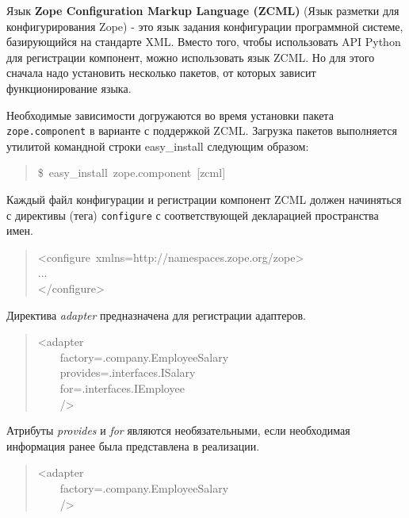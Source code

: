 \documentclass[14pt,a4paper,openany,twoside,final]{extbook}
\providecommand*{\DUroletitlereference}[1]{\textsl{#1}}
\begin{document}
Язык \textbf{Zope Configuration Markup Language (ZCML)} (Язык разметки для
конфигурирования Zope) - это язык задания конфигурации программной
системе, базирующийся на стандарте XML.  Вместо того, чтобы
использовать API Python для регистрации компонент, можно использовать
язык ZCML.  Но для этого сначала надо установить несколько пакетов, от
которых зависит функционирование языка.

Необходимые зависимости догружаются во время установки пакета
\texttt{zope.component} в варианте с поддержкой ZCML.  Загрузка пакетов
выполняется утилитой командной строки easy\_install следующим образом:

\begin{quote}{\ttfamily \raggedright \noindent
\$~easy\_install~\textquotedbl{}zope.component~{[}zcml{]}\textquotedbl{}
}
\end{quote}

Каждый файл конфигурации и регистрации компонент ZCML должен
начиняться с директивы (тега) \texttt{configure} с соответствующей
декларацией пространства имен.

\begin{quote}{\ttfamily \raggedright \noindent
<configure~xmlns=\textquotedbl{}http://namespaces.zope.org/zope\textquotedbl{}>\\
...\\
</configure>
}
\end{quote}

Директива \DUroletitlereference{adapter} предназначена для регистрации адаптеров.

\begin{quote}{\ttfamily \raggedright \noindent
<adapter\\
~~~~factory=\textquotedbl{}.company.EmployeeSalary\textquotedbl{}\\
~~~~provides=\textquotedbl{}.interfaces.ISalary\textquotedbl{}\\
~~~~for=\textquotedbl{}.interfaces.IEmployee\textquotedbl{}\\
~~~~/>
}
\end{quote}

Атрибуты \DUroletitlereference{provides} и \DUroletitlereference{for} являются необязательными, если необходимая
информация ранее была представлена в реализации.

\begin{quote}{\ttfamily \raggedright \noindent
<adapter\\
~~~~factory=\textquotedbl{}.company.EmployeeSalary\textquotedbl{}\\
~~~~/>
}
\end{quote}
\end{document}
